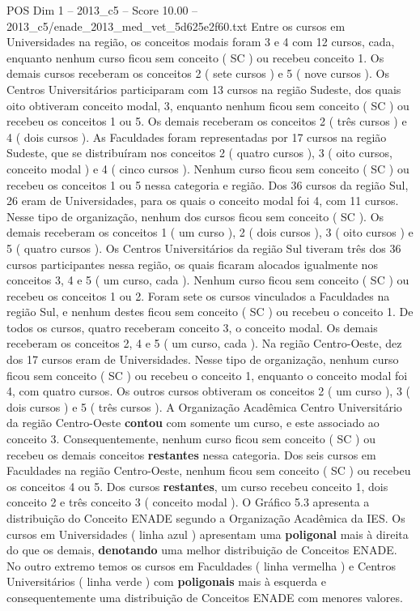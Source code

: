 \begin{textsample}{POS Dim 1 – 2013\_c5 – Score 10.00 – 2013\_c5/enade\_2013\_med\_vet\_5d625e2f60.txt}
Entre os cursos em Universidades na região, os conceitos modais foram 3 e 4 com 12 cursos, cada, enquanto nenhum curso ficou sem conceito ( SC ) ou recebeu conceito 1.
Os demais cursos receberam os conceitos 2 ( sete cursos ) e 5 ( nove cursos ).
Os Centros Universitários participaram com 13 cursos na região Sudeste, dos quais oito obtiveram conceito modal, 3, enquanto nenhum ficou sem conceito ( SC ) ou recebeu os conceitos 1 ou 5.
Os demais receberam os conceitos 2 ( três cursos ) e 4 ( dois cursos ).
As Faculdades foram representadas por 17 cursos na região Sudeste, que se distribuíram nos conceitos 2 ( quatro cursos ), 3 ( oito cursos, conceito modal ) e 4 ( cinco cursos ).
Nenhum curso ficou sem conceito ( SC ) ou recebeu os conceitos 1 ou 5 nessa categoria e região.
Dos 36 cursos da região Sul, 26 eram de Universidades, para os quais o conceito modal foi 4, com 11 cursos.
Nesse tipo de organização, nenhum dos cursos ficou sem conceito ( SC ).
Os demais receberam os conceitos 1 ( um curso ), 2 ( dois cursos ), 3 ( oito cursos ) e 5 ( quatro cursos ).
Os Centros Universitários da região Sul tiveram três dos 36 cursos participantes nessa região, os quais ficaram alocados igualmente nos conceitos 3, 4 e 5 ( um curso, cada ).
Nenhum curso ficou sem conceito ( SC ) ou recebeu os conceitos 1 ou 2.
Foram sete os cursos vinculados a Faculdades na região Sul, e nenhum destes ficou sem conceito ( SC ) ou recebeu o conceito 1.
De todos os cursos, quatro receberam conceito 3, o conceito modal.
Os demais receberam os conceitos 2, 4 e 5 ( um curso, cada ).
Na região Centro-Oeste, dez dos 17 cursos eram de Universidades.
Nesse tipo de organização, nenhum curso ficou sem conceito ( SC ) ou recebeu o conceito 1, enquanto o conceito modal foi 4, com quatro cursos.
Os outros cursos obtiveram os conceitos 2 ( um curso ), 3 ( dois cursos ) e 5 ( três cursos ).
A Organização Acadêmica Centro Universitário da região Centro-Oeste \textbf{contou} com somente um curso, e este associado ao conceito 3.
Consequentemente, nenhum curso ficou sem conceito ( SC ) ou recebeu os demais conceitos \textbf{restantes} nessa categoria.
Dos seis cursos em Faculdades na região Centro-Oeste, nenhum ficou sem conceito ( SC ) ou recebeu os conceitos 4 ou 5.
Dos cursos \textbf{restantes}, um curso recebeu conceito 1, dois conceito 2 e três conceito 3 ( conceito modal ).
O Gráfico 5.3 apresenta a distribuição do Conceito ENADE segundo a Organização Acadêmica da IES.
Os cursos em Universidades ( linha azul ) apresentam uma \textbf{poligonal} mais à direita do que os demais, \textbf{denotando} uma melhor distribuição de Conceitos ENADE.
No outro extremo temos os cursos em Faculdades ( linha vermelha ) e Centros Universitários ( linha verde ) com \textbf{poligonais} mais à esquerda e consequentemente uma distribuição de Conceitos ENADE com menores valores.

\end{textsample}
